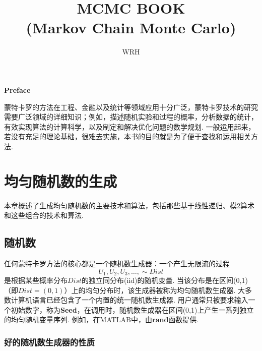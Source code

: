 \documentclass[a4paper,UTF-8,12pt]{ctexbook}
\title{MCMC BOOK\\ (Markov Chain Monte Carlo)}
\author{WRH}
\date{}
\renewcommand{\proofname}{\indent\bf 证明}
\newcommand{\prefacename}{Preface}
\newenvironment{preface}{
		\vspace*{\stretch{2}}
		{\noindent \bfseries \Huge \prefacename}
		\begin{center}
			\thispagestyle{plain}
		\end{center}%
	}
	{\vspace*{\stretch{5}}}
\begin{document}
		\renewcommand{\proofname}{\indent\bf 证明}
		\renewcommand{\qedsymbol}{$\blacksquare$}    %
		\maketitle
		\thispagestyle{empty}%
		\pagestyle{empty}
		
		
		\frontmatter
		
		\begin{preface}
			\quad 蒙特卡罗的方法在工程、金融以及统计等领域应用十分广泛，蒙特卡罗技术的研究需要广泛领域的详细知识；例如，描述随机实验和过程的{\color{brown}概率}，分析数据的{\color{brown}统计}，有效实现算法的{\color{brown}计算科学}，以及制定和解决优化问题的{\color{brown}数学规划}. 一般运用起来，若没有充足的理论基础，很难去实施，本书的目的就是为了便于查找和运用相关方法.
			
			
		\end{preface}
		
		
		\clearpage
		
		\tableofcontents
		
		\clearpage
		\listoffigures
		
		\clearpage
		\listoftables
		
		
		
		\mainmatter
		\chapter{均匀随机数的生成}
		本章概述了生成均匀随机数的主要技术和算法，包括那些基于线性递归、模2算术和这些组合的技术和算法.
		\section{随机数}
		任何蒙特卡罗方法的核心都是一个随机数生成器：一个产生无限流的过程
		$$U_1,U_2,U_3,\dots,\sim Dist$$
		是根据某些概率分布$Dist$的独立同分布(iid)的随机变量. 当该分布是在区间(0,1)（即$Dist = (0,1)$）上的均匀分布时，该生成器被称为均匀随机数生成器. 大多数计算机语言已经包含了一个内置的统一随机数生成器. 用户通常只被要求输入一个初始数字，称为\textbf{Seed}，在调用时，随机数生成器在区间(0,1)上产生一系列独立的均匀随机变量序列. 例如，在MATLAB中，由\textbf{rand}函数提供.
		
		\subsection{好的随机数生成器的性质}

	
\end{document}
